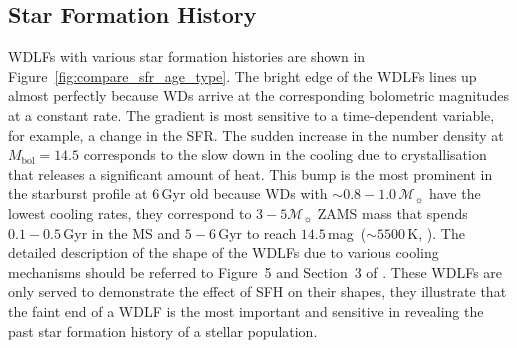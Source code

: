 \documentclass[fleqn,usenatbib]{rasti}
\newcommand{\msun}{\mathcal{M}_{\sun}}
\begin{document}
\subsection{Star Formation History}
WDLFs with various star formation histories are shown in
Figure~\ref{fig:compare_sfr_age_type}. The bright edge of the WDLFs lines up
almost perfectly because WDs arrive at the corresponding bolometric magnitudes
at a constant rate. The gradient is most sensitive to a time-dependent
variable, for example, a change in the SFR. The sudden increase in the number
density at $M_\mathrm{bol}=14.5$ corresponds to the slow down in the cooling
due to crystallisation that releases a significant amount of heat. This bump
is the most prominent in the starburst profile at $6$\,Gyr old because WDs
with $\sim0.8-1.0\,\msun$ have the lowest cooling rates, they correspond
to $3-5\msun$ ZAMS mass that spends $0.1-0.5$\,Gyr in the MS and $5-6$\,Gyr
to reach $14.5$\,mag~($\sim 5500$\,K, \citealp{2019ApJ...876...67B}). The
detailed description of the shape of the WDLFs due to various cooling
mechanisms should be referred to Figure~5 and Section~3
of \citealp{2001PASP..113..409F}. These WDLFs are only served to demonstrate
the effect of SFH on their shapes, they illustrate that the faint end
of a WDLF is the most important and sensitive in revealing the past
star formation history of a stellar population.
\end{document}
